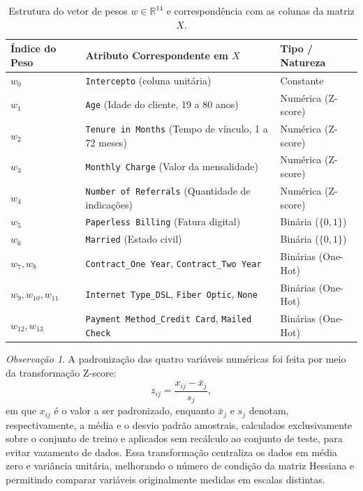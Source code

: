 \documentclass{article}
\theoremstyle{remark}
\newtheorem*{obs}{Observação}
\newenvironment{observacao}{\begin{obs}\small}{\end{obs}}
\begin{document}
\begin{table}[ht]
\centering
\caption{Estrutura do vetor de pesos $w \in \mathbb{R}^{14}$ e correspondência com as colunas da matriz $X$.} 
\label{tab:estrutura_pesos}
\renewcommand{\arraystretch}{1.15}
\begin{tabularx}{\textwidth}{@{} l X l @{}}
\toprule
\textbf{Índice do Peso} & \textbf{Atributo Correspondente em $X$} & \textbf{Tipo / Natureza} \\
\midrule
$w_0$ & \texttt{Intercepto} (coluna unitária) & Constante \\
$w_1$ & \texttt{Age} (Idade do cliente, 19 a 80 anos) & Numérica (Z-score) \\
$w_2$ & \texttt{Tenure in Months} (Tempo de vínculo, 1 a 72 meses) & Numérica (Z-score) \\
$w_3$ & \texttt{Monthly Charge} (Valor da mensalidade) & Numérica (Z-score) \\
$w_4$ & \texttt{Number of Referrals} (Quantidade de indicações) & Numérica (Z-score) \\
$w_5$ & \texttt{Paperless Billing} (Fatura digital) & Binária ($\{0,1\}$) \\
$w_6$ & \texttt{Married} (Estado civil) & Binária ($\{0,1\}$) \\
$w_7, w_8$ & \texttt{Contract\_One Year}, \texttt{Contract\_Two Year} & Binárias (One-Hot) \\
$w_9, w_{10}, w_{11}$ & \texttt{Internet Type\_DSL}, \texttt{Fiber Optic}, \texttt{None} & Binárias (One-Hot) \\
$w_{12}, w_{13}$ & \texttt{Payment Method\_Credit Card}, \texttt{Mailed Check} & Binárias (One-Hot) \\
\bottomrule
\end{tabularx}
\end{table}

\begin{observacao}
A padronização das quatro variáveis numéricas foi feita por meio da transformação Z-score:
\[
z_{ij} = \frac{x_{ij} - \bar{x}_j}{s_j},
\]
em que $x_{ij}$ é o valor a ser padronizado, enquanto $\bar{x}_j$ e $s_j$ denotam, respectivamente, a média e o desvio padrão amostrais, calculados exclusivamente sobre o conjunto de treino e aplicados sem recálculo ao conjunto de teste, para evitar vazamento de dados. Essa transformação centraliza os dados em média zero e variância unitária, melhorando o número de condição da matriz Hessiana e permitindo comparar variáveis originalmente medidas em escalas distintas.\\
\end{observacao}
\end{document}

